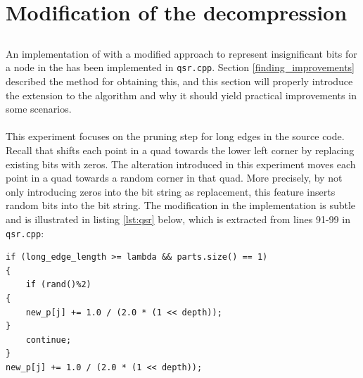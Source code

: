 \section{Modification of the \qs{} decompression}
\label{qsr}
\subsection{\qsr{}}
An implementation of \qs{} with a modified approach to represent insignificant bits for a node in the \qt{} has been implemented in \texttt{qsr.cpp}. Section \ref{finding_improvements} described the method for obtaining this, and this section will properly introduce the extension to the algorithm and why it should yield practical improvements in some scenarios.
\\
\\
This experiment focuses on the pruning step for long edges in the source code. Recall that \qs{} shifts each point in a quad towards the lower left corner by replacing existing bits with zeros. The alteration introduced in this experiment moves each point in a quad towards a random corner in that quad. More precisely, by not only introducing zeros into the bit string as replacement, this feature inserts random bits into the bit string. The modification in the implementation is subtle and is illustrated in listing \ref{lst:qsr} below, which is extracted from lines 91-99 in \texttt{qsr.cpp}:

\begin{lstlisting}[caption={Pruning with random bits},label={lst:qsr}]
if (long_edge_length >= lambda && parts.size() == 1)
{
	if (rand()%2)
{
	new_p[j] += 1.0 / (2.0 * (1 << depth));
}
	continue;
}
new_p[j] += 1.0 / (2.0 * (1 << depth));
\end{lstlisting}

